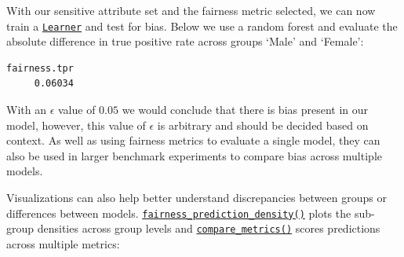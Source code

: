 With our sensitive attribute set and the fairness metric selected, we
can now train a
\href{https://mlr3.mlr-org.com/reference/Learner.html}{\texttt{Learner}}
and test for bias. Below we use a random forest and evaluate the
absolute difference in true positive rate across groups `Male' and
`Female':

\begin{Shaded}
\begin{Highlighting}[]
\OtherTok{=} \NormalTok{(}\NormalTok{)}
\OtherTok{=} \NormalTok{(}\NormalTok{, } \NormalTok{)}
\OtherTok{=}\SpecialCharTok{$}\SpecialCharTok{$}
\SpecialCharTok{$}
\end{Highlighting}
\end{Shaded}

\begin{verbatim}
fairness.tpr 
     0.06034 
\end{verbatim}

With an \(\epsilon\) value of \(0.05\) we would conclude that there is
bias present in our model, however, this value of \(\epsilon\) is
arbitrary and should be decided based on context. As well as using
fairness metrics to evaluate a single model, they can also be used in
larger benchmark experiments to compare bias across multiple models.

Visualizations can also help better understand discrepancies between
groups or differences between models.
\href{https://mlr3fairness.mlr-org.com/reference/fairness_prediction_density.html}{\texttt{fairness\_prediction\_density()}}
plots the sub-group densities across group levels and
\href{https://mlr3fairness.mlr-org.com/reference/compare_metrics.html}{\texttt{compare\_metrics()}}
scores predictions across multiple metrics:


